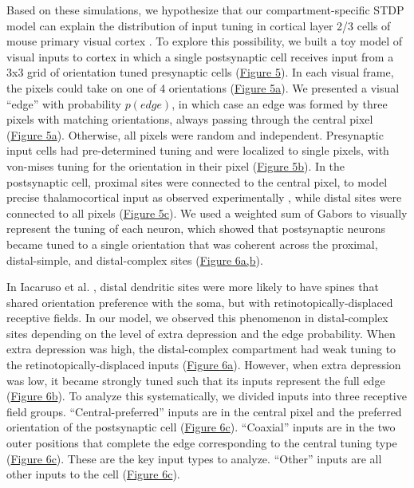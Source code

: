 Based on these simulations, we hypothesize that our compartment-specific STDP model can explain the distribution of input tuning in cortical layer 2/3 cells of mouse primary visual cortex \citep{iacarusoSynapticOrganizationVisual2017}. To explore this possibility, we built a toy model of visual inputs to cortex in which a single postsynaptic cell receives input from a 3x3 grid of orientation tuned presynaptic cells (\hyperref[fig:5]{Figure 5}). In each visual frame, the pixels could take on one of 4 orientations (\hyperref[fig:5]{Figure 5a}). We presented a visual “edge” with probability $p(edge)$, in which case an edge was formed by three pixels with matching orientations, always passing through the central pixel (\hyperref[fig:5]{Figure 5a}). Otherwise, all pixels were random and independent. Presynaptic input cells had pre-determined tuning and were localized to single pixels, with von-mises tuning for the orientation in their pixel (\hyperref[fig:5]{Figure 5b}). In the postsynaptic cell, proximal sites were connected to the central pixel, to model precise thalamocortical input as observed experimentally \citep{zhuangLaminarDistributionArbor2021}, while distal sites were connected to all pixels (\hyperref[fig:5]{Figure 5c}). We used a weighted sum of Gabors to visually represent the tuning of each neuron, which showed that postsynaptic neurons became tuned to a single orientation that was coherent across the proximal, distal-simple, and distal-complex sites (\hyperref[fig:6]{Figure 6a,b}). 

In Iacaruso et al. \citep{iacarusoSynapticOrganizationVisual2017}, distal dendritic sites were more likely to have spines that shared orientation preference with the soma, but with retinotopically-displaced receptive fields. In our model, we observed this phenomenon in distal-complex sites depending on the level of extra depression and the edge probability. When extra depression was high, the distal-complex compartment had weak tuning to the retinotopically-displaced inputs (\hyperref[fig:6]{Figure 6a}). However, when extra depression was low, it became strongly tuned such that its inputs represent the full edge (\hyperref[fig:6]{Figure 6b}). To analyze this systematically, we divided inputs into three receptive field groups. “Central-preferred” inputs are in the central pixel and the preferred orientation of the postsynaptic cell (\hyperref[fig:6]{Figure 6c}). “Coaxial” inputs are in the two outer positions that complete the edge corresponding to the central tuning type (\hyperref[fig:6]{Figure 6c}). These are the key input types to analyze. “Other” inputs are all other inputs to the cell (\hyperref[fig:6]{Figure 6c}). 

